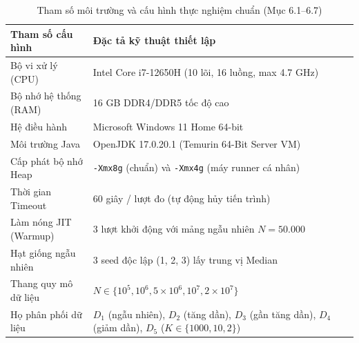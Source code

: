 \documentclass[conference]{IEEEtran}
\begin{document}
\begin{table}[htbp]
\caption{Tham số môi trường và cấu hình thực nghiệm chuẩn (Mục 6.1--6.7)}
\label{tab:setup}
\centering
\small
\begin{tabularx}{\columnwidth}{lX}
\toprule
\textbf{Tham số cấu hình} & \textbf{Đặc tả kỹ thuật thiết lập} \\
\midrule
Bộ vi xử lý (CPU) & Intel Core i7-12650H (10 lõi, 16 luồng, max 4.7 GHz) \\
Bộ nhớ hệ thống (RAM) & 16 GB DDR4/DDR5 tốc độ cao \\
Hệ điều hành & Microsoft Windows 11 Home 64-bit \\
Môi trường Java & OpenJDK 17.0.20.1 (Temurin 64-Bit Server VM) \\
Cấp phát bộ nhớ Heap & \texttt{-Xmx8g} (chuẩn) và \texttt{-Xmx4g} (máy runner cá nhân) \\
Thời gian Timeout & 60 giây / lượt đo (tự động hủy tiến trình) \\
Làm nóng JIT (Warmup) & 3 lượt khởi động với mảng ngẫu nhiên $N = 50.000$ \\
Hạt giống ngẫu nhiên & 3 seed độc lập (1, 2, 3) lấy trung vị Median \\
Thang quy mô dữ liệu & $N \in \{10^5, 10^6, 5\times 10^6, 10^7, 2\times 10^7\}$ \\
Họ phân phối dữ liệu & $D_1$ (ngẫu nhiên), $D_2$ (tăng dần), $D_3$ (gần tăng dần), $D_4$ (giảm dần), $D_5$ ($K \in \{1000, 10, 2\}$) \\
\bottomrule
\end{tabularx}
\end{table}
\end{document}
